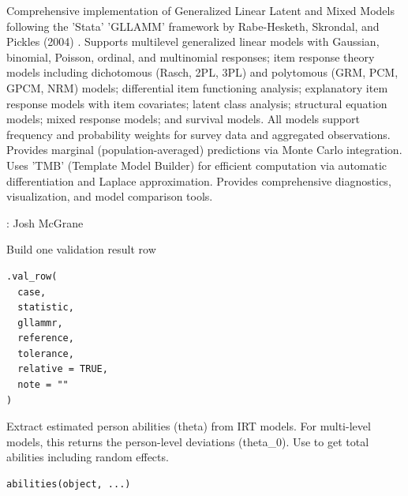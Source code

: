 \documentclass[a4paper]{book}
\begin{document}
%
\begin{Description}
Comprehensive implementation of Generalized Linear Latent and Mixed Models following the 'Stata' 'GLLAMM' framework by Rabe-Hesketh, Skrondal, and Pickles (2004) . Supports multilevel generalized linear models with Gaussian, binomial, Poisson, ordinal, and multinomial responses; item response theory models including dichotomous (Rasch, 2PL, 3PL) and polytomous (GRM, PCM, GPCM, NRM) models; differential item functioning analysis; explanatory item response models with item covariates; latent class analysis; structural equation models; mixed response models; and survival models. All models support frequency and probability weights for survey data and aggregated observations. Provides marginal (population-averaged) predictions via Monte Carlo integration. Uses 'TMB' (Template Model Builder) for efficient computation via automatic differentiation and Laplace approximation. Provides comprehensive diagnostics, visualization, and model comparison tools.
\end{Description}
%
\begin{Author}
: Josh McGrane 

\end{Author}
%
\begin{Description}
Build one validation result row
\end{Description}
%
\begin{Usage}
\begin{verbatim}
.val_row(
  case,
  statistic,
  gllammr,
  reference,
  tolerance,
  relative = TRUE,
  note = ""
)
\end{verbatim}
\end{Usage}
%
\begin{Description}
Extract estimated person abilities (theta) from IRT models.
For multi-level models, this returns the person-level deviations (theta\_0).
Use  to get total abilities including random effects.
\end{Description}
%
\begin{Usage}
\begin{verbatim}
abilities(object, ...)
\end{verbatim}
\end{Usage}
\end{document}
